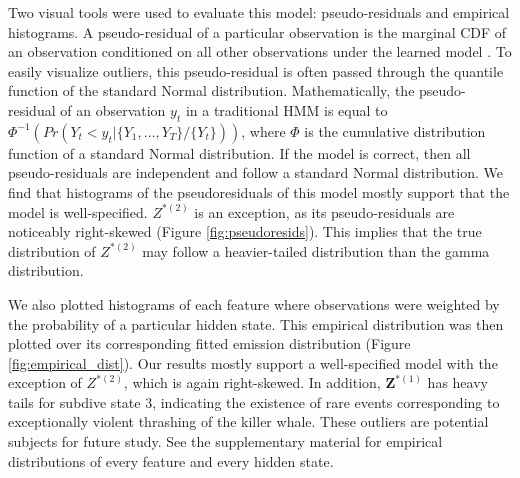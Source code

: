 Two visual tools were used to evaluate this model: pseudo-residuals and empirical histograms. A pseudo-residual of a particular observation is the marginal CDF of an observation conditioned on all other observations under the learned model \citep{Zucchini:2016}. To easily visualize outliers, this pseudo-residual is often passed through the quantile function of the standard Normal distribution. Mathematically, the pseudo-residual of an observation $y_t$ in a traditional HMM is equal to $\Phi^{-1} \left(Pr(Y_t < y_t|\{Y_1,\ldots,Y_T\}/\{Y_t\}) \right)$, where $\Phi$ is the cumulative distribution function of a standard Normal distribution. If the model is correct, then all pseudo-residuals are independent and follow a standard Normal distribution. We find that histograms of the pseudoresiduals of this model mostly support that the model is well-specified. $Z^{*(2)}$ is an exception, as its pseudo-residuals are noticeably right-skewed (Figure \ref{fig:pseudoresids}). This implies that the true distribution of $Z^{*(2)}$ may follow a heavier-tailed distribution than the gamma distribution. 

We also plotted histograms of each feature where observations were weighted by the probability of a particular hidden state. This empirical distribution was then plotted over its corresponding fitted emission distribution (Figure \ref{fig:empirical_dist}). Our results mostly support a well-specified model with the exception of $Z^{*(2)}$, which is again right-skewed. In addition, $\mathbf{Z}^{*(1)}$ has heavy tails for subdive state 3, indicating the existence of rare events corresponding to exceptionally violent thrashing of the killer whale. These outliers are potential subjects for future study. See the supplementary material for empirical distributions of every feature and every hidden state. 